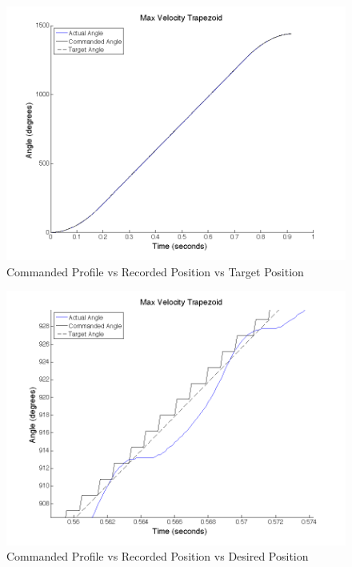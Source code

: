 \documentclass{article}
\theoremstyle{plain}
\theoremstyle{definition}
\theoremstyle{remark}
\begin{document}
\begin{figure}[hbt]
\begin{center}
\includegraphics[width = 13cm]{4cProfile.png}
\caption{Commanded Profile vs Recorded Position vs Target Position}
\label{Q4c_Profile}
\end{center}
\end{figure}

\begin{figure}[hbt]
\begin{center}
\includegraphics[width = 13cm]{4cProfileDetail1.png}
\caption{Commanded Profile vs Recorded Position vs Desired Position}
\label{Q4c_ProfileDetail}
\end{center}
\end{figure}
\end{document}
